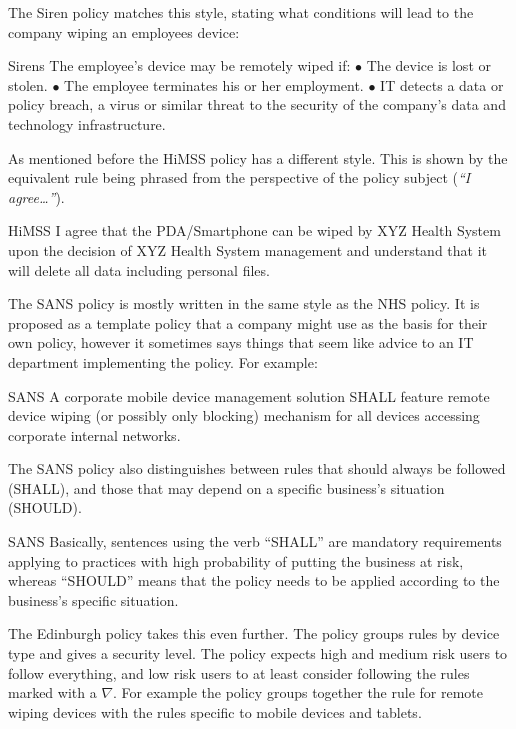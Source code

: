\documentclass[thesis.tex]{subfiles}
\begin{document}
The Siren policy matches this style, stating what conditions will lead to the
company wiping an employees device:

\begin{policyrule}{Sirens}
The employee's device may be remotely wiped if: $\bullet$ The device is lost or
stolen. $\bullet$ The employee terminates his or her employment. $\bullet$ IT
detects a data or policy breach, a virus or similar threat to the security of
the company's data and technology infrastructure.
\end{policyrule}

As mentioned before the \ac{HiMSS} policy has a different style.  This is shown
by the equivalent rule being phrased from the perspective of the policy subject
(\emph{``I agree\dots''}).

\begin{policyrule}{HiMSS}
  I agree that the PDA/Smartphone can be wiped by XYZ Health System upon the
  decision of XYZ Health System management and understand that it will delete all
  data including personal files.
\end{policyrule}

The SANS policy is mostly written in the same style as the NHS policy.  It is
proposed as a template policy that a company might use as the basis for their
own policy, however it sometimes says things that seem like advice to an IT
department implementing the policy.  For example:

\begin{policyrule}{SANS}
   A corporate mobile device management solution SHALL feature remote device
   wiping (or possibly only blocking) mechanism for all devices accessing
   corporate internal networks.
\end{policyrule}

The SANS policy also distinguishes between rules that should always be followed (SHALL),
and those that may depend on a specific business's situation (SHOULD).

\begin{policyrule}{SANS}
  Basically, sentences using the verb ``SHALL'' are mandatory requirements
  applying to practices with high probability of putting the business at risk,
  whereas ``SHOULD'' means that the policy needs to be applied according to the
  business's specific situation.
\end{policyrule}

The Edinburgh policy takes this even further. The policy groups rules by device type
and gives a security level.  The policy expects high and medium risk users
to follow everything, and low risk users to at least
consider following the rules marked with a $\nabla$.  For example the policy groups together the
rule for remote wiping devices with the rules specific to mobile
devices and tablets. 
\end{document}
